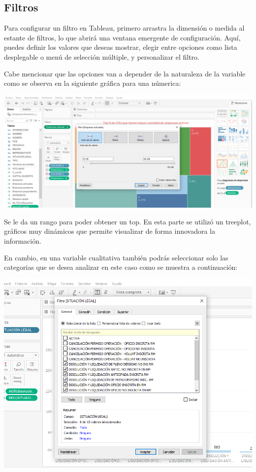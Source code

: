\documentclass[
]{article}
\begin{document}
\hypertarget{filtros}{%
\subsection{Filtros}\label{filtros}}

Para configurar un filtro en Tableau, primero arrastra la dimensión o
medida al estante de filtros, lo que abrirá una ventana emergente de
configuración. Aquí, puedes definir los valores que deseas mostrar,
elegir entre opciones como lista desplegable o menú de selección
múltiple, y personalizar el filtro.

Cabe mencionar que las opciones van a depender de la naturaleza de la
variable como se observa en la siguiente gráfica para una númerica:

\includegraphics{imagenes/pr3.png}

Se le da un rango para poder obtener un top. En esta parte se utilizó un
treeplot, gráficos muy dinámicos que permite visualizar de forma
innovadora la información.

En cambio, en una variable cualitativa también podrás seleccionar solo
las categorias que se desea analizar en este caso como se muestra a
continuación:

\includegraphics{imagenes/pr7.png}
\end{document}
